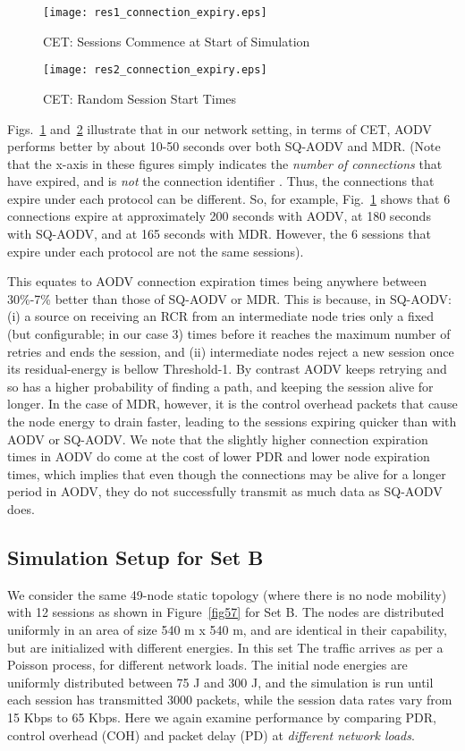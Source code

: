 \begin{figure}[htbp]
	\centering
	\texttt{[image: res1\_connection\_expiry.eps]}
	\caption{CET: Sessions Commence at Start of Simulation}
	\label{fig514}
\end{figure}

\begin{figure}[htbp]
	\centering
	\texttt{[image: res2\_connection\_expiry.eps]}
	\caption{CET: Random Session Start Times}
	\label{fig515}
\end{figure}

Figs.~\ref{fig514} and~\ref{fig515} illustrate that in our network setting, in terms of CET, AODV performs better by about 10-50 seconds over both SQ-AODV and MDR. (Note that the x-axis in these figures simply indicates the {\it number of connections} that have expired, and is {\it not} the connection identifier . Thus, the connections that expire under each protocol can be different. So, for example, Fig.~\ref{fig514} shows that 6 connections expire at approximately 200 seconds with AODV, at 180 seconds with SQ-AODV, and at 165 seconds with MDR. However, the 6 sessions that expire under each protocol
are not the same sessions).

This equates to AODV connection expiration times being anywhere between 30\%-7\% better than those of SQ-AODV or MDR. This is because, in SQ-AODV: (i) a source on receiving an RCR from an intermediate node tries only a fixed (but configurable; in our case 3) times before it reaches the maximum number of
retries and ends the session, and (ii) intermediate nodes reject a new session once its residual-energy is bellow Threshold-1. By contrast AODV keeps retrying and so has a higher probability of finding a path, and keeping the session alive for longer. In the case of MDR, however, it is the control overhead packets that cause the node energy to drain faster, leading to the sessions expiring quicker than with AODV or SQ-AODV. We note that the slightly higher connection expiration times in AODV do come at the cost of lower PDR and lower node expiration times, which implies that even though the connections may be alive for a longer period in AODV, they do not successfully transmit as much data as SQ-AODV does.

\subsection{Simulation Setup for Set B}

We consider the same 49-node static topology (where there is no node mobility) with 12 sessions as shown in Figure~\ref{fig57} for Set B. The nodes are distributed uniformly in an area of size 540 m x 540 m, and are identical in their capability, but are initialized with different energies. In this set The traffic arrives as per a Poisson process, for different network loads. The initial node energies are uniformly distributed between 75 J and 300 J, and the simulation is run until each session has transmitted 3000 packets, while the session data rates vary from 15 Kbps to 65 Kbps. Here we again examine performance by comparing PDR, control overhead (COH) and packet delay (PD) at {\it{different network loads}}.


